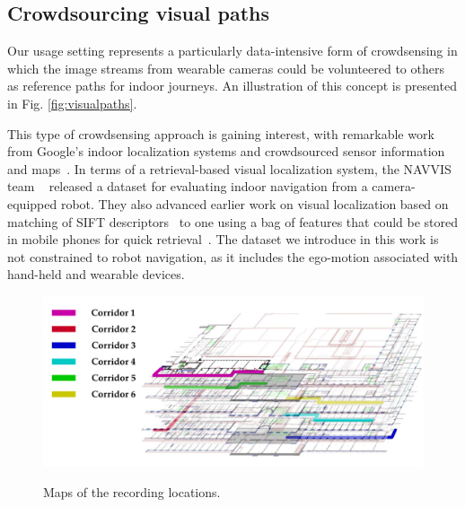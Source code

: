 \subsection{Crowdsourcing visual paths}
\label{subsec:visual_paths}
Our usage setting represents a particularly data-intensive form of crowdsensing in which the image streams  from wearable cameras could be volunteered to others as reference paths for indoor journeys. An illustration of this concept is presented in Fig. \ref{fig:visualpaths}. 

This type of crowdsensing approach is gaining interest, with remarkable work from Google's indoor localization systems and crowdsourced sensor information and maps~\cite{Kadous2013}. In terms of a retrieval-based visual localization system, the NAVVIS team ~\cite{Huitl2012} released a dataset for evaluating indoor navigation from a camera-equipped robot. They also advanced earlier work on visual localization based on matching of SIFT descriptors~\cite{Park2008} to one using a bag of features that could be stored in mobile phones for quick retrieval~\cite{Schroth2011,Schroth2012}. The dataset we introduce in this work is not constrained to robot navigation, as it includes the ego-motion associated with hand-held and wearable devices.

\begin{figure}[t]
\includegraphics[width=\linewidth]{./gfx/Chapter04/map_and_legend.pdf}\label{fig:visualpathsA}
\caption{Maps of the recording locations.}
\label{fig:map_and_legend}
\end{figure}


